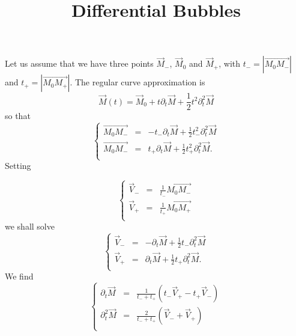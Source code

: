 \documentclass[aps]{revtex4}
\newcommand{\myvec}[1]{\overrightarrow{#1}}
\begin{document}
\title{Differential Bubbles}
\maketitle
Let us assume that we have three points $\vec{M}_-$, $\vec{M}_0$ and $\vec{M}_+$, with
$t_-=\left\vert \myvec{M_0M_-}\right\vert$ and $t_+=\left\vert \myvec{M_0M_+}\right\vert$.
The regular curve approximation is
\begin{equation}
	\vec{M}(t) = \vec{M}_0 + t \partial_t \vec{M} + \frac{1}{2} t^2 \partial_{t}^2 \vec{M}
\end{equation}
so that
\begin{equation}
\left\lbrace
\begin{array}{rcl}
	\myvec{M_0M_-} & = & -t_- \partial_t \vec{M} + \frac{1}{2} t_-^2 \partial_{t}^2 \vec{M}\\
	\myvec{M_0M_-} & = &  t_+ \partial_t \vec{M} + \frac{1}{2} t_+^2 \partial_{t}^2 \vec{M}.\\
\end{array}
\right.
\end{equation}
Setting

\begin{equation}
\left\lbrace
\begin{array}{rcl}
	\vec{V}_- & = & \frac{1}{t_-} \myvec{M_0M_-}\\
	\vec{V}_+ & = & \frac{1}{t_+} \myvec{M_0M_+}\\
\end{array}
\right.
\end{equation}
we shall solve
\begin{equation}
	\left\lbrace
	\begin{array}{rcl}
	\vec{V}_- & = & -\partial_t \vec{M} + \frac{1}{2} t_- \partial_{t}^2 \vec{M}\\
	\vec{V}_+ & = & \partial_t \vec{M} + \frac{1}{2} t_+ \partial_{t}^2 \vec{M}.\\
	\end{array}
\right.
\end{equation}
We find
\begin{equation}
	\left\lbrace
	\begin{array}{rcl}
	\partial_t \vec{M} & = & \frac{1}{t_-+t_+} \left(t_-\vec{V}_+ - t_+ \vec{V}_-\right)\\
	\partial_{t}^2 \vec{M} & = & \frac{2}{t_-+t_+} \left(\vec{V}_- + \vec{V}_+\right) \\
	\end{array}
	\right.
\end{equation}
\end{document}
